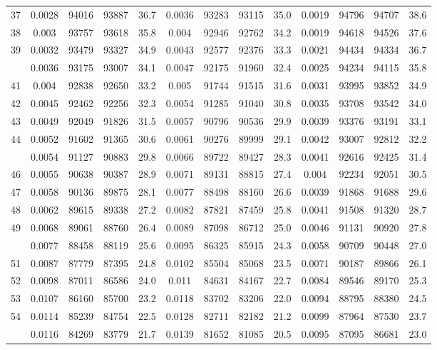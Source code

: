 \documentclass[
  14pt,
]{article}
\begin{document}
\begin{longtable}[t]{lcccccccccccc}
37 & 0.0028 & 94016 & 93887 & 36.7 & 0.0036 & 93283 & 93115 & 35.0 & 0.0019 & 94796 & 94707 & 38.6\\
38 & 0.003 & 93757 & 93618 & 35.8 & 0.004 & 92946 & 92762 & 34.2 & 0.0019 & 94618 & 94526 & 37.6\\
39 & 0.0032 & 93479 & 93327 & 34.9 & 0.0043 & 92577 & 92376 & 33.3 & 0.0021 & 94434 & 94334 & 36.7\\
\addlinespace
40 & 0.0036 & 93175 & 93007 & 34.1 & 0.0047 & 92175 & 91960 & 32.4 & 0.0025 & 94234 & 94115 & 35.8\\
41 & 0.004 & 92838 & 92650 & 33.2 & 0.005 & 91744 & 91515 & 31.6 & 0.0031 & 93995 & 93852 & 34.9\\
42 & 0.0045 & 92462 & 92256 & 32.3 & 0.0054 & 91285 & 91040 & 30.8 & 0.0035 & 93708 & 93542 & 34.0\\
43 & 0.0049 & 92049 & 91826 & 31.5 & 0.0057 & 90796 & 90536 & 29.9 & 0.0039 & 93376 & 93191 & 33.1\\
44 & 0.0052 & 91602 & 91365 & 30.6 & 0.0061 & 90276 & 89999 & 29.1 & 0.0042 & 93007 & 92812 & 32.2\\
\addlinespace
45 & 0.0054 & 91127 & 90883 & 29.8 & 0.0066 & 89722 & 89427 & 28.3 & 0.0041 & 92616 & 92425 & 31.4\\
46 & 0.0055 & 90638 & 90387 & 28.9 & 0.0071 & 89131 & 88815 & 27.4 & 0.004 & 92234 & 92051 & 30.5\\
47 & 0.0058 & 90136 & 89875 & 28.1 & 0.0077 & 88498 & 88160 & 26.6 & 0.0039 & 91868 & 91688 & 29.6\\
48 & 0.0062 & 89615 & 89338 & 27.2 & 0.0082 & 87821 & 87459 & 25.8 & 0.0041 & 91508 & 91320 & 28.7\\
49 & 0.0068 & 89061 & 88760 & 26.4 & 0.0089 & 87098 & 86712 & 25.0 & 0.0046 & 91131 & 90920 & 27.8\\
\addlinespace
50 & 0.0077 & 88458 & 88119 & 25.6 & 0.0095 & 86325 & 85915 & 24.3 & 0.0058 & 90709 & 90448 & 27.0\\
51 & 0.0087 & 87779 & 87395 & 24.8 & 0.0102 & 85504 & 85068 & 23.5 & 0.0071 & 90187 & 89866 & 26.1\\
52 & 0.0098 & 87011 & 86586 & 24.0 & 0.011 & 84631 & 84167 & 22.7 & 0.0084 & 89546 & 89170 & 25.3\\
53 & 0.0107 & 86160 & 85700 & 23.2 & 0.0118 & 83702 & 83206 & 22.0 & 0.0094 & 88795 & 88380 & 24.5\\
54 & 0.0114 & 85239 & 84754 & 22.5 & 0.0128 & 82711 & 82182 & 21.2 & 0.0099 & 87964 & 87530 & 23.7\\
\addlinespace
55 & 0.0116 & 84269 & 83779 & 21.7 & 0.0139 & 81652 & 81085 & 20.5 & 0.0095 & 87095 & 86681 & 23.0\\

\end{longtable}
\end{document}

